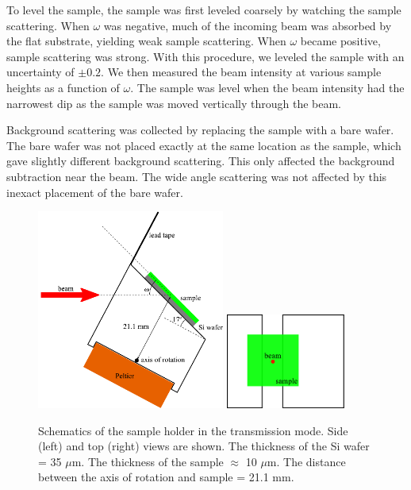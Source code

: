 To level the sample, 
the sample was first leveled coarsely by watching the sample scattering. When
$\omega$ was negative, much of the incoming beam was absorbed by the 
flat substrate, yielding weak sample scattering. When $\omega$ became 
positive, sample scattering was strong. With this procedure, 
we leveled the sample with an uncertainty of $\pm 0.2$\textdegree. We
then measured the beam intensity at various sample heights 
as a function of $\omega$. 
The sample was 
level when the beam intensity had the narrowest dip as the sample
was moved vertically through the beam.

Background scattering was collected by replacing the sample with a bare 
wafer. The bare wafer was not placed exactly at the same location
as the sample, which gave slightly different background scattering.
This only affected the background subtraction near the beam. 
The wide angle scattering was not affected by
this inexact placement of the bare wafer. 

\begin{figure}[htbp]
  \centering
  \includegraphics[width=0.55\textwidth]{figures/ripple/MMs/transmission/holder_side}
  \includegraphics[width=0.35\textwidth]{figures/ripple/MMs/transmission/holder_top}
  \caption{Schematics of the sample holder in the transmission mode.
  Side (left) and top (right) views are shown. The thickness of the Si wafer
  = 35 $\mu$m. The thickness of the sample $\approx$ 10 $\mu$m. The
  distance between the axis of rotation and sample = 21.1 mm.}
  \label{fig:holder_schematic}
\end{figure}


